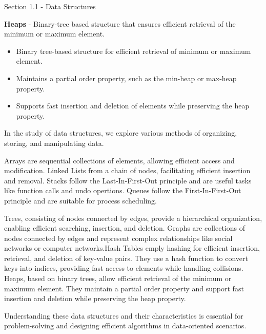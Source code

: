 \begin{notes}{Section 1.1 - Data Structures}
\begin{highlight}
        \textbf{Heaps} - Binary-tree based structure that ensures efficient retrieval of the minimum or maximum element.
        \begin{itemize}
            \item Binary tree-based structure for efficient retrieval of minimum or maximum element.
            \item Maintains a partial order property, such as the min-heap or max-heap property.
            \item Supports fast insertion and deletion of elements while preserving the heap property.
        \end{itemize}
    \end{highlight}
    
    In the study of data structures, we explore various methods of organizing, storing, and manipulating data.
    
    Arrays are sequential collections of elements, allowing efficient access and modification. Linked Lists from a chain of nodes, facilitating
    efficient insertion and removal. Stacks follow the Last-In-First-Out principle and are useful tasks like function calls and undo opertions.
    Queues follow the First-In-First-Out principle and are suitable for process scheduling.
    
    Trees, consisting of nodes connected by edges, provide a hierarchical organization, enabling efficient searching, insertion, and deletion.
    Graphs are collections of nodes connected by edges and represent complex relationships like social networks or computer networks.Hash Tables emply hashing for efficient insertion, retrieval, and deletion of key-value pairs. 
    They use a hash function to convert keys into indices, providing fast access to elements while handling collisions. Heaps, based on binary trees, allow efficient retrieval of the minimum or maximum element. They maintain a 
    partial order property and support fast insertion and deletion while preserving the heap property.
    
    Understanding these data structures and their characteristics is essential for problem-solving and designing efficient algorithms in data-oriented
    scenarios.
\end{notes}


